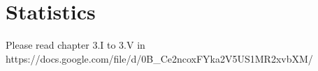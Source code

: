 
\section{Statistics}

Please read chapter 3.I to 3.V in https://docs.google.com/file/d/0B\_Ce2ncoxFYka2V5US1MR2xvbXM/



